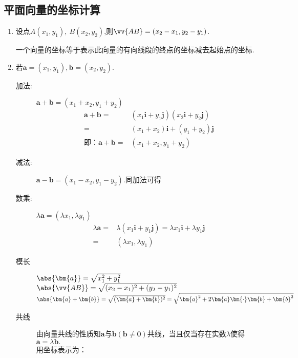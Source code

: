 \begin{Theorem}[平面向量基本定理]
  \subsection{平面向量的坐标计算}
    \begin{enumerate}
      \item
        设点$ A(x_1,y_1),~B(x_2,y_2) $,则$ \vv{AB}=(x_2-x_1,y_2-y_1) $.\par
        一个向量的坐标等于表示此向量的有向线段的终点的坐标减去起始点的坐标.
      \item
        若$\bm{a}=\left(x_1,y_1\right),\bm{b}=\left(x_2,y_2\right)$.
        \begin{description}
          \item[加法:]
            $\bm{a}+\bm{b}=(x_1+x_2,y_1+y_2)$
            \begin{equation*}
            \begin{aligned}
            \bm{a}+\bm{b}=&\left(x_1\bm{i}+y_1\bm{j}\right)\left(x_2\bm{i}+y_2\bm{j}\right)\\
            =&\left(x_1+x_2\right)\bm{i}+\left(y_1+y_2\right)\bm{j}\\
            \text{即：}\bm{a}+\bm{b}=&(x_1+x_2,y_1+y_2)
            \end{aligned}
            \end{equation*}
          \item[减法:] $\bm{a}-\bm{b}=\left(x_1-x_2,y_1-y_2\right)$.同加法可得
          \item[数乘:]
            $ \lambda \bm{a}=\left(\lambda x_1,\lambda y_1\right) $\begin{equation*}
            \begin{aligned}
             \lambda \bm{a} =&\lambda\left(x_1\bm{i}+y_1\bm{j}\right)=\lambda x_1\bm{i}+\lambda y_1\bm{j}\\
            =&\left(\lambda x_1,\lambda y_1\right)
            \end{aligned}
            \end{equation*}
          \item[模长]
           $\abs{\bm{a}}=\sqrt{x_1^2+y_1^2}$\qquad
           $\abs{\vv{AB}}=\sqrt{(x_2-x_1)^2+(y_2-y_1)^2}$\\
           \qquad $\abs{\bm{a}+\bm{b}}=\sqrt{(\bm{a}+\bm{b})^2}=\sqrt{\bm{a}^2+2\bm{a}\bm{\cdot}\bm{b}+\bm{b}^2}$\\
          \item[共线]
            由向量共线的性质知$ \bm{a} $与$ \bm{b}(\bm{b}\ne\bm{0}) $共线，当且仅当存在实数$ \lambda $使得$ \bm{a}=\lambda \bm{b} .$\\用坐标表示为：

\end{description}
\end{enumerate}
\end{Theorem}
